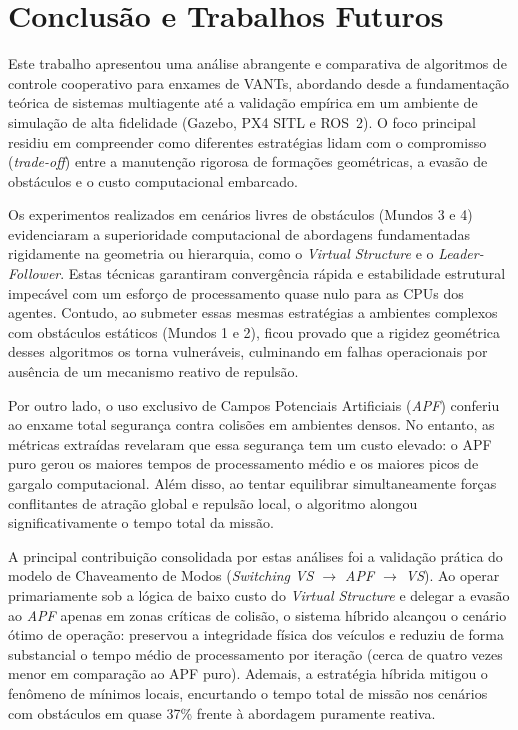 
\section{Conclusão e Trabalhos Futuros}
\label{sec:conclusao}

Este trabalho apresentou uma análise abrangente e comparativa de algoritmos de controle cooperativo para enxames de VANTs, abordando desde a fundamentação teórica de sistemas multiagente até a validação empírica em um ambiente de simulação de alta fidelidade (Gazebo, PX4 SITL e ROS~2). O foco principal residiu em compreender como diferentes estratégias lidam com o compromisso (\textit{trade-off}) entre a manutenção rigorosa de formações geométricas, a evasão de obstáculos e o custo computacional embarcado.

Os experimentos realizados em cenários livres de obstáculos (Mundos 3 e 4) evidenciaram a superioridade computacional de abordagens fundamentadas rigidamente na geometria ou hierarquia, como o \textit{Virtual Structure} e o \textit{Leader-Follower}. Estas técnicas garantiram convergência rápida e estabilidade estrutural impecável com um esforço de processamento quase nulo para as CPUs dos agentes. Contudo, ao submeter essas mesmas estratégias a ambientes complexos com obstáculos estáticos (Mundos 1 e 2), ficou provado que a rigidez geométrica desses algoritmos os torna vulneráveis, culminando em falhas operacionais por ausência de um mecanismo reativo de repulsão.

Por outro lado, o uso exclusivo de Campos Potenciais Artificiais (\textit{APF}) conferiu ao enxame total segurança contra colisões em ambientes densos. No entanto, as métricas extraídas revelaram que essa segurança tem um custo elevado: o APF puro gerou os maiores tempos de processamento médio e os maiores picos de gargalo computacional. Além disso, ao tentar equilibrar simultaneamente forças conflitantes de atração global e repulsão local, o algoritmo alongou significativamente o tempo total da missão.

A principal contribuição consolidada por estas análises foi a validação prática do modelo de Chaveamento de Modos (\textit{Switching VS $\rightarrow$ APF $\rightarrow$ VS}). Ao operar primariamente sob a lógica de baixo custo do \textit{Virtual Structure} e delegar a evasão ao \textit{APF} apenas em zonas críticas de colisão, o sistema híbrido alcançou o cenário ótimo de operação: preservou a integridade física dos veículos e reduziu de forma substancial o tempo médio de processamento por iteração (cerca de quatro vezes menor em comparação ao APF puro). Ademais, a estratégia híbrida mitigou o fenômeno de mínimos locais, encurtando o tempo total de missão nos cenários com obstáculos em quase 37\% frente à abordagem puramente reativa.

